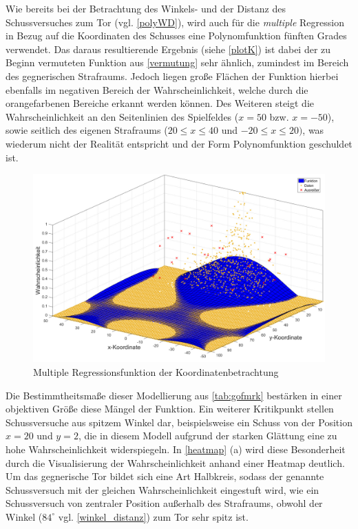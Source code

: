 Wie bereits bei der Betrachtung des Winkels- und der Distanz des Schussversuches zum Tor (vgl. \vref{polyWD}), wird auch für die \textit{multiple} Regression in Bezug auf die Koordinaten des Schusses eine Polynomfunktion fünften Grades verwendet. Das daraus resultierende Ergebnis (siehe \vref{plotK}) ist dabei der zu Beginn vermuteten Funktion aus \vref{vermutung} sehr ähnlich, zumindest im Bereich des gegnerischen Strafraums. Jedoch liegen große Flächen der Funktion hierbei ebenfalls im negativen Bereich der Wahrscheinlichkeit, welche durch die orangefarbenen Bereiche erkannt werden können. Des Weiteren steigt die Wahrscheinlichkeit an den Seitenlinien des Spielfeldes ($x=50$ bzw. $x=-50$), sowie seitlich des eigenen Strafraums ($20 \le x \le 40$ und $-20 \le x \le 20)$, was wiederum nicht der Realität entspricht und der Form Polynomfunktion geschuldet ist.

\begin{figure}[H]
\centering
\includegraphics[scale=0.34]{se-wa-jpg/plotK}
\caption{Multiple Regressionsfunktion der Koordinatenbetrachtung}
\label{plotK}
\end{figure}

Die Bestimmtheitsmaße dieser Modellierung aus \vref{tab:gofmrk} bestärken in einer objektiven Größe diese Mängel der Funktion. Ein weiterer Kritikpunkt stellen Schussversuche aus spitzem Winkel dar, beispielsweise ein Schuss von der Position $x=20$ und $y=2$, die in diesem Modell aufgrund der starken Glättung eine zu hohe Wahrscheinlichkeit widerspiegeln. In \vref{heatmap} (a) wird diese Besonderheit durch die Visualisierung der Wahrscheinlichkeit anhand einer Heatmap deutlich. Um das gegnerische Tor bildet sich eine Art Halbkreis, sodass der genannte Schussversuch mit der gleichen Wahrscheinlichkeit eingestuft wird, wie ein Schussversuch von zentraler Position außerhalb des Strafraums, obwohl der Winkel ($84^\circ$ vgl. \vref{winkel_distanz}) zum Tor sehr spitz ist.

